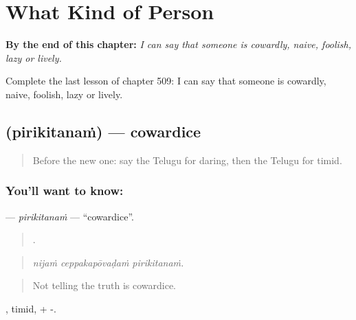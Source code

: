 
\chapter{What Kind of Person}
\label{ch:te-what-kind-of-person}

\begin{chapteropening}
\textbf{By the end of this chapter:} \emph{I can say that someone is cowardly, naive, foolish, lazy or lively.}

Complete the last lesson of chapter 509: I can say that someone is cowardly, naive, foolish, lazy or lively.
\end{chapteropening}

\section[\texorpdfstring{\te{పిరికితనం} (pirikitanaṁ)}{పిరికితనం (pirikitanaṁ)}]{ (pirikitanaṁ) — cowardice}

\label{lesson:TE-C509-pirikitanam}



\begin{quote}
Before the new one: say the Telugu for daring, then the Telugu for timid.
\end{quote}

\subsection*{You'll want to know: }
\textbf{} — \emph{pirikitanaṁ} — \textquotedblleft{}cowardice\textquotedblright{}.

\begin{quote}
  .
\end{quote}

\begin{quote}
\emph{nijaṁ ceppakapōvaḍaṁ pirikitanaṁ.}
\end{quote}

\begin{quote}
Not telling the truth is cowardice.
\end{quote}

, timid, + -.

